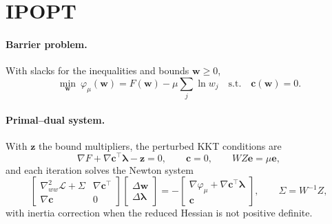 \documentclass[11pt,a4paper]{article}
\begin{document}
\section{IPOPT}\label{app:ipopt}
\paragraph{Barrier problem.} With slacks for the inequalities and bounds $\mathbf{w} \ge 0$,
\begin{equation}
\min_{\mathbf{w}}\ \varphi_\mu(\mathbf{w}) = F(\mathbf{w}) - \mu \sum_j \ln w_j
\quad \text{s.t.} \quad \mathbf{c}(\mathbf{w}) = 0 .
\end{equation}
\paragraph{Primal--dual system.} With $\mathbf{z}$ the bound multipliers, the perturbed KKT conditions are
\begin{equation}
\nabla F + \nabla\mathbf{c}^\top\boldsymbol\lambda - \mathbf{z} = 0, \qquad
\mathbf{c} = 0, \qquad W Z \mathbf{e} = \mu\mathbf{e},
\end{equation}
and each iteration solves the Newton system
\begin{equation}
\begin{bmatrix} \nabla^2_{ww}\mathcal{L} + \Sigma & \nabla\mathbf{c}^\top \\ \nabla\mathbf{c} & 0 \end{bmatrix}
\begin{bmatrix} \Delta\mathbf{w} \\ \Delta\boldsymbol\lambda \end{bmatrix}
= - \begin{bmatrix} \nabla\varphi_\mu + \nabla\mathbf{c}^\top\boldsymbol\lambda \\ \mathbf{c} \end{bmatrix},
\qquad \Sigma = W^{-1} Z,
\end{equation}
with inertia correction when the reduced Hessian is not positive definite.
\end{document}
